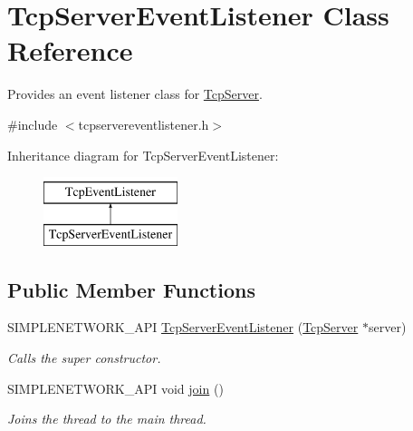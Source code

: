 \hypertarget{class_tcp_server_event_listener}{}\section{Tcp\+Server\+Event\+Listener Class Reference}
\label{class_tcp_server_event_listener}


Provides an event listener class for \mbox{\hyperlink{class_tcp_server}{Tcp\+Server}}.  




{\ttfamily \#include $<$tcpservereventlistener.\+h$>$}

Inheritance diagram for Tcp\+Server\+Event\+Listener\+:\begin{figure}[H]
\begin{center}
\leavevmode
\includegraphics[height=2.000000cm]{class_tcp_server_event_listener}
\end{center}
\end{figure}
\subsection*{Public Member Functions}
\begin{DoxyCompactItemize}
\item 
S\+I\+M\+P\+L\+E\+N\+E\+T\+W\+O\+R\+K\+\_\+\+A\+PI \mbox{\hyperlink{class_tcp_server_event_listener_a07c2697a13038b4b12ded097e4d6aa2b}{Tcp\+Server\+Event\+Listener}} (\mbox{\hyperlink{class_tcp_server}{Tcp\+Server}} $\ast$server)
\begin{DoxyCompactList}\small\item\em Calls the super constructor. \end{DoxyCompactList}\item 
\mbox{\label{class_tcp_server_event_listener_a4e2b349aa6fe166976af80ec1cec2d2d}} 
S\+I\+M\+P\+L\+E\+N\+E\+T\+W\+O\+R\+K\+\_\+\+A\+PI void \mbox{\hyperlink{class_tcp_server_event_listener_a4e2b349aa6fe166976af80ec1cec2d2d}{join}} ()
\begin{DoxyCompactList}\small\item\em Joins the thread to the main thread. \end{DoxyCompactList}\end{DoxyCompactItemize}
